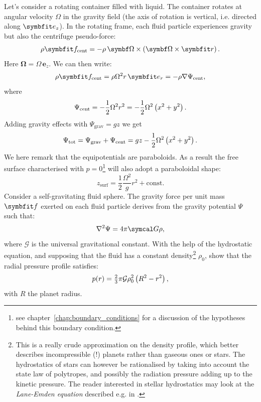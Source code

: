  Let's consider a rotating container filled with liquid. The container rotates at angular velocity $\Omega$ in the gravity field (the axis of rotation is vertical, i.e. directed along  $\be_{z}$). In the rotating frame, each fluid particle experiences gravity but also the centrifuge pseudo-force:
\begin{equation}
\rho\bff_\text{cent} = -\rho \,\symbf \Omega \times \lp \symbf  \Omega \times \br\rp.
\end{equation}
Here $\symbf \Omega = \Omega \,\symbf e_{z}$. We can then write:
\begin{equation}
\rho\bff_\text{cent} = \rho \Omega^2 r \,\be_{r} = -\rho \nabla \Psi_\text{cent},
\end{equation}
where
\begin{equation}
\Psi_\text{cent} = -\frac{1}{2} \Omega^2 r^2 = -\frac{1}{2} \Omega^2 \left( x^2 + y^2\right).
\end{equation}
Adding gravity effects with $\Psi_\text{grav} = gz$ we get 
\begin{equation}
\Psi_\text{tot} = \Psi_\text{grav} + \Psi_\text{cent}  = gz -\frac{1}{2} \Omega^2 \left( x^2 + y^2\right).
\end{equation} 
We here remark that the equipotentials are paraboloids. As a result the free surface characterised with $p = 0$\footnote{see chapter~\ref{chap:boundary_conditions} for a discussion of the hypotheses behind this boundary condition.} will also adopt a paraboloidal shape:
\begin{equation}
z_\text{surf} = \frac{1}{2} \frac{\Omega^2}{g} r^2 + \text{const}.
\end{equation}
 Consider a self-gravitating fluid sphere. The gravity force per unit mass $\bff$ exerted on each fluid particle derives from the gravity potential $\Psi$ such that:
\begin{equation}
\nabla^2 \Psi = 4 \pi \symcal G \rho,
\end{equation}
where $\mathcal G$ is the universal gravitational constant. With the help of the hydrostatic equation, and supposing that the fluid has a constant density\footnote{This is a really crude approximation on the density profile, which better describes incompressible (!) planets rather than gaseous ones or stars. The hydrostatics of stars can however be rationalised by taking into account the state law of polytropes, and possibly the radiation pressure adding up to the kinetic pressure. The reader interested in stellar hydrostatics may look at the \textit{Lane-Emden equation} described e.g. in \citet[][chap. IV]{Chandrasekhar1957}.} $\rho_0$, show that the radial pressure profile satisfies:
\begin{equation}
p(r) = \tfrac{2}{3}  \pi \mathcal G \rho_0^2 \left( R^2 - r^2\right),
\end{equation}
with $R$ the planet radius.

